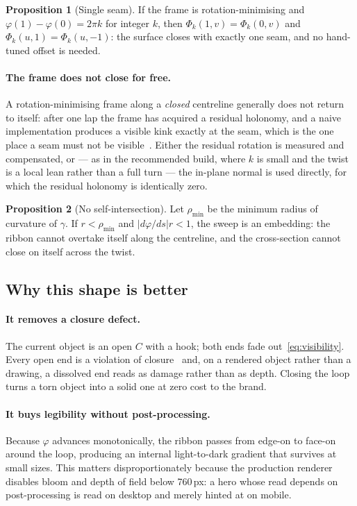 \documentclass[11pt,a4paper]{article}
\theoremstyle{definition}
\newtheorem{proposition}{Proposition}
\begin{document}
\begin{proposition}[Single seam]
If the frame is rotation-minimising and $\varphi(1)-\varphi(0)=2\pi k$ for
integer $k$, then $\Phi_k(1,v)=\Phi_k(0,v)$ and $\Phi_k(u,1)=\Phi_k(u,-1)$:
the surface closes with exactly one seam, and no hand-tuned offset is needed.
\end{proposition}

\paragraph{The frame does not close for free.} A rotation-minimising frame
along a \emph{closed} centreline generally does not return to itself: after one
lap the frame has acquired a residual holonomy, and a naive implementation
produces a visible kink exactly at the seam, which is the one place a seam must
not be visible~\cite{wang2008}. Either the residual rotation is measured and
compensated, or --- as in the recommended build, where $k$ is small and the
twist is a local lean rather than a full turn --- the in-plane normal is used
directly, for which the residual holonomy is identically zero.

\begin{proposition}[No self-intersection]
Let $\rho_{\min}$ be the minimum radius of curvature of $\gamma$. If
$r<\rho_{\min}$ and $\bigl\lvert d\varphi/ds\bigr\rvert r<1$, the sweep is an
embedding: the ribbon cannot overtake itself along the centreline, and the
cross-section cannot close on itself across the twist.
\end{proposition}

\subsection{Why this shape is better}

\paragraph{It removes a closure defect.} The current object is an open
$C$ with a hook; both ends fade out~\eqref{eq:visibility}. Every open end is a
violation of closure~\cite{wagemans2012} and, on a rendered object rather than a
drawing, a dissolved end reads as damage rather than as depth. Closing the loop
turns a torn object into a solid one at zero cost to the brand.

\paragraph{It buys legibility without post-processing.} Because
$\varphi$ advances monotonically, the ribbon passes from edge-on to face-on
around the loop, producing an internal light-to-dark gradient that survives at
small sizes. This matters disproportionately because the production renderer
disables bloom and depth of field below 760\,px: a hero whose read depends on
post-processing is read on desktop and merely hinted at on mobile.
\end{document}
